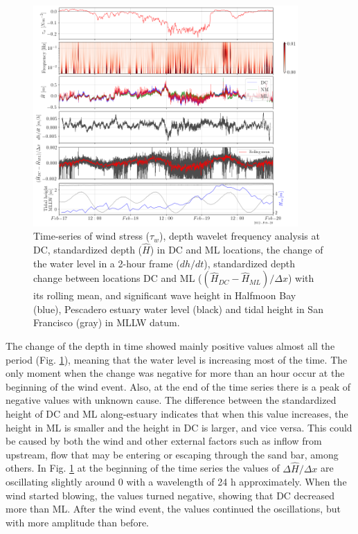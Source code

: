 \documentclass[tesis.tex]{subfiles}
\begin{document}
    \begin{figure}[h!]
      \centering
      \includegraphics[width=0.9\textwidth]{Imagenes/surf2.png}
      \caption{Time-series of wind stress ($\tau_w$), depth wavelet frequency analysis at DC, standardized depth ($\hat{H}$) in DC and ML locations, the change of the water level in a 2-hour frame ($dh/dt$), standardized depth change between locations DC and ML ($(\hat{H}_{DC}-\hat{H}_{ML})/\Delta x$) with its rolling mean, and significant wave height in Halfmoon Bay (blue), Pescadero estuary water level (black) and tidal height in San Francisco (gray) in MLLW datum.}
      \label{fig:surf2}
    \end{figure}
    
    The change of the depth in time showed mainly positive values almost all the period (Fig. \ref{fig:surf2}), meaning that the water level is increasing most of the time. The only moment when the change was negative for more than an hour occur at the beginning of the wind event. Also, at the end of the time series there is a peak of negative values with unknown cause. The difference between the standardized height of DC and ML along-estuary indicates that when this value increases, the height in ML is smaller and the height in DC is larger, and vice versa. This could be caused by both the wind and other external factors such as inflow from upstream, flow that may be entering or escaping through the sand bar, among others. In Fig. \ref{fig:surf2} at the beginning of the time series the values of $\Delta \hat{H}/\Delta x$ are oscillating slightly around 0 with a wavelength of 24 h approximately. When the wind started blowing, the values turned negative, showing that DC decreased more than ML. After the wind event, the values continued the oscillations, but with more amplitude than before.\\
    
\end{document}
